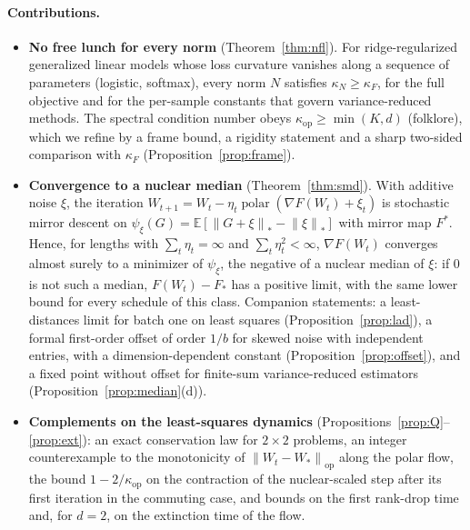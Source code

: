 \documentclass[11pt]{article}
\theoremstyle{remark}
\newcommand{\E}{\mathbb{E}}
\newcommand{\nop}[1]{\left\|#1\right\|_{\mathrm{op}}}
\newcommand{\nnuc}[1]{\left\|#1\right\|_{*}}
\newcommand{\polar}{\operatorname{polar}}
\newcommand{\kop}{\kappa_{\mathrm{op}}}
\newcommand{\kF}{\kappa_{F}}
\begin{document}
\paragraph{Contributions.}
\begin{itemize}[leftmargin=1.3em,itemsep=1pt,topsep=2pt]
\item \textbf{No free lunch for every norm} (Theorem~\ref{thm:nfl}). For ridge-regularized generalized linear models
whose loss curvature vanishes along a sequence of parameters (logistic, softmax), every norm $N$ satisfies
$\kappa_N\ge\kF$, for the full objective and for the per-sample constants that govern variance-reduced methods. The
spectral condition number obeys $\kop\ge\min(K,d)$ (folklore), which we refine by a frame bound, a rigidity statement
and a sharp two-sided comparison with $\kF$ (Proposition~\ref{prop:frame}).
\item \textbf{Convergence to a nuclear median} (Theorem~\ref{thm:smd}). With additive noise $\xi$, the iteration
$W_{t+1}=W_t-\eta_t\polar(\nabla F(W_t)+\xi_t)$ is stochastic mirror descent on $\psi_\xi(G)=\E[\nnuc{G+\xi}-\nnuc\xi]$ with
mirror map $F^\ast$. Hence, for lengths with $\sum_t\eta_t=\infty$ and $\sum_t\eta_t^2<\infty$, $\nabla F(W_t)$
converges almost surely to a minimizer of $\psi_\xi$, the negative of a nuclear median of $\xi$: if $0$ is not such a
median, $F(W_t)-F_\ast$ has a positive limit, with the same lower bound for every schedule of this class. Companion
statements: a least-distances limit for batch one on least squares (Proposition~\ref{prop:lad}), a formal first-order
offset of order $1/b$ for skewed noise with independent entries, with a dimension-dependent constant
(Proposition~\ref{prop:offset}), and a fixed point without offset for finite-sum variance-reduced estimators
(Proposition~\ref{prop:median}(d)).
\item \textbf{Complements on the least-squares dynamics} (Propositions~\ref{prop:Q}--\ref{prop:ext}): an exact
conservation law for $2\times2$ problems, an integer counterexample to the monotonicity of $\nop{W_t-W_\ast}$ along the
polar flow, the bound $1-2/\kop$ on the contraction of the nuclear-scaled step after its first iteration in the
commuting case, and bounds on the first rank-drop time and, for $d=2$, on the extinction time of the flow.
\end{itemize}
\end{document}
